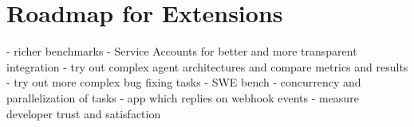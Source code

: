 \section{Roadmap for Extensions} \label{section:roadmap}
- richer benchmarks
- Service Accounts for better and more transparent integration
- try out complex agent architectures and compare metrics and results
- try out more complex bug fixing tasks - SWE bench
- concurrency and parallelization of tasks
- app which replies on webhook events
- measure developer trust and satisfaction